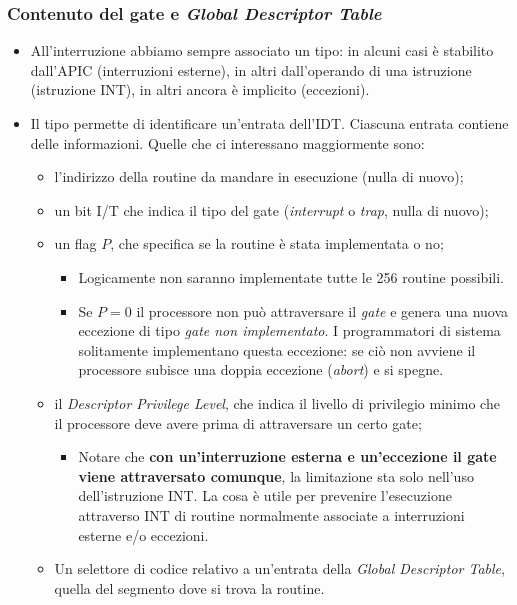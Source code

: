 \subsubsection{Contenuto del gate e \emph{Global Descriptor Table}}  	
\begin{itemize}
	\item All'interruzione abbiamo sempre associato un tipo: in alcuni casi è stabilito dall'APIC (interruzioni esterne), in altri dall'operando di una istruzione (istruzione INT), in altri ancora è implicito (eccezioni).
	\item Il tipo permette di identificare un'entrata dell'IDT. Ciascuna entrata contiene delle informazioni. Quelle che ci interessano maggiormente sono:
	\begin{itemize}
		\item l'indirizzo della routine da mandare in esecuzione (nulla di nuovo);
		\item un bit I/T che indica il tipo del gate (\textit{interrupt} o \textit{trap}, nulla di nuovo);
		\item un flag $P$, che specifica se la routine è stata implementata o no;
		\begin{itemize} 
			\item Logicamente non saranno implementate tutte le 256 routine possibili.
			\item Se $P=0$ il processore non può attraversare il \emph{gate} e genera una nuova eccezione di tipo \emph{gate non implementato}. I programmatori di sistema solitamente implementano questa eccezione: se ciò non avviene il processore subisce una doppia eccezione (\emph{abort}) e si spegne. 
		\end{itemize}
		\item il \emph{Descriptor Privilege Level}, che indica il livello di privilegio minimo  che il processore deve avere prima di attraversare un certo gate;
		\begin{itemize}
			\item Notare che \textbf{con un'interruzione esterna e un'eccezione il gate viene attraversato comunque}, la limitazione sta solo nell'uso dell'istruzione INT. La cosa è utile per prevenire l'esecuzione attraverso INT di routine normalmente associate a interruzioni esterne e/o eccezioni.
		\end{itemize} 
		\item Un selettore di codice relativo a un'entrata della \emph{Global Descriptor Table}, quella del segmento dove si trova la routine.
	\end{itemize}
\end{itemize} 

